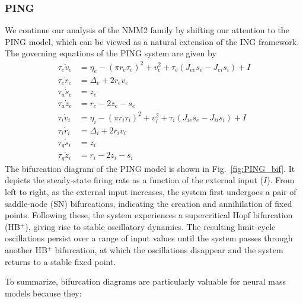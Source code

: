 \subsubsection*{PING}
We continue our analysis of the NMM2 family by shifting our attention to the PING model, which can be viewed as a natural extension of the ING framework. The governing equations of the PING system are given by
\begin{equation}
\begin{aligned}
\tau_e \dot{v}_e &= \eta_e - \left( \pi r_e \tau_e \right)^2 + v_e^2 + \tau_e \left( J_{ee} s_e - J_{ei} s_i \right) + I \\
\tau_e \dot{r}_e &= \Delta_e + 2 r_e v_e \\
\tau_a \dot{s}_e &= z_e \\
\tau_a \dot{z}_e &= r_e - 2z_e - s_e \\
\tau_i \dot{v}_i &= \eta_i - \left( \pi r_i \tau_i \right)^2 + v_i^2 + \tau_i \left( J_{ie} s_e - J_{ii} s_i \right) + I \\
\tau_i \dot{r}_i &= \Delta_i + 2 r_i v_i \\
\tau_g \dot{s}_i &= z_i \\
\tau_g \dot{z}_i &= r_i - 2z_i - s_i
\end{aligned}
\end{equation}
The bifurcation diagram of the PING model is shown in Fig.~\ref{fig:PING_bif}. It depicts the steady-state firing rate as a function of the external input ($I$). 
From left to right, as the external input increases, the system first undergoes a pair of saddle-node (SN) bifurcations, indicating the creation and annihilation of fixed points. Following these, the system experiences a supercritical Hopf bifurcation (HB$^{+}$), giving rise to stable oscillatory dynamics. The resulting limit-cycle oscillations persist over a range of input values until the system passes through another HB$^{+}$ bifurcation, at which the oscillations disappear and the system returns to a stable fixed point.



\newpage

To summarize, bifurcation diagrams are particularly valuable for neural mass models because they:

